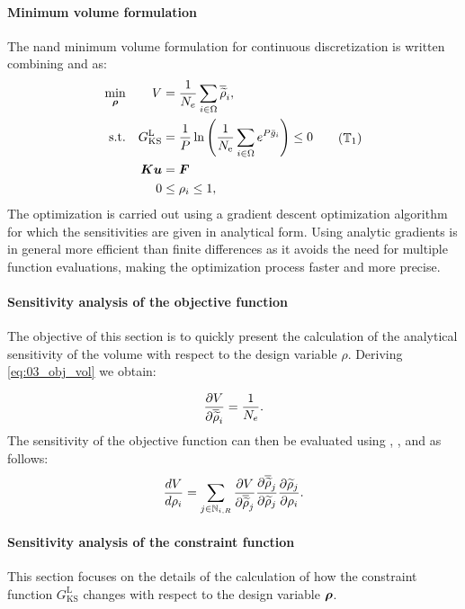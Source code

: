 \paragraph{Minimum volume formulation}
The \gls{nand} minimum volume formulation for continuous discretization is written combining  and  as:
\begin{equation}
    \begin{aligned}
    \min_{\bm{\rho}}         && V &= \frac{1}{N_{e}} \sum_{i \in \Omega} \rhophys_i,  \\
    \textrm{s.t.}   && G_{\text{KS}}^\text{L} &= \frac{1}{P} \ln{\left( \frac{1}{N_\text{e}} \sum_{i \in \Omega} e^{{P}\bar{g}_i} \right)} \leq 0 \\
    && \bm{K}\bm{u} &= \bm{F}\\
    && 0 &\leq \rho_i \leq 1, \\
    \end{aligned}
    \tag{$\mathbb{T}_1$}
    \label{eq:03_prob-stress}
\end{equation}
The optimization is carried out using a gradient descent optimization algorithm for which the sensitivities are given in analytical form. Using analytic gradients is in general more efficient than finite differences as it avoids the need for multiple function evaluations, making the optimization process faster and more precise.

\paragraph{Sensitivity analysis of the objective function}
The objective of this section is to quickly present the calculation of the analytical sensitivity of the volume with respect to the design variable $\rho$. Deriving \eqref{eq:03_obj_vol} we obtain:

\begin{equation}
    \frac{\partial V}{\partial\overline{\widetilde{\rho}}_i} = \frac{1}{N_{e}}.
    \label{eq:03_01}
\end{equation}
The sensitivity of the objective function can then be evaluated using  , , and  as follows:
\begin{equation}
    \frac{d V}{d \rho_i} = \sum_{j \in \mathbb{N}_{i,R}} \frac{\partial V}{\partial\overline{\widetilde{\rho}}_j} \frac{\partial\overline{\widetilde{\rho}}_j}{\partial\widetilde{\rho}_j} \frac{\partial\widetilde{\rho}_j}{\partial\rho_i}.
\end{equation}
\paragraph{Sensitivity analysis of the constraint function}
This section focuses on the details of the calculation of how the constraint function $G_{\text{KS}}^\text{L}$ changes with respect to the design variable $\bm{\rho}$.

